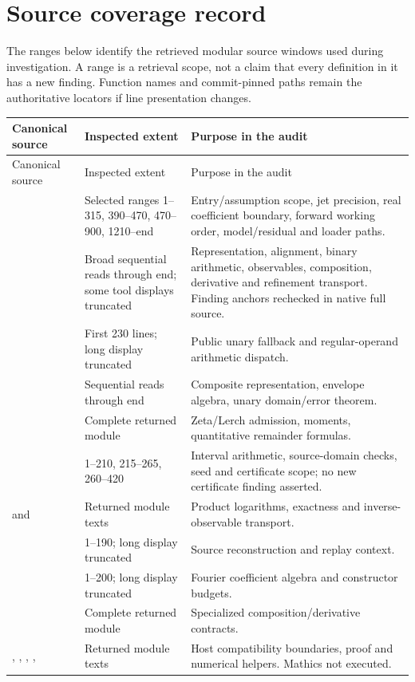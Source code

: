 \documentclass[11pt,a4paper]{article}
\begin{document}
\section{Source coverage record}
\label{app:coverage}
The ranges below identify the retrieved modular source windows used during investigation. A range is a retrieval scope, not a claim that every definition in it has a new finding. Function names and commit-pinned paths remain the authoritative locators if line presentation changes.
\small
\begin{longtable}{@{}P{57mm}P{33mm}P{59mm}@{}}
\toprule
Canonical source & Inspected extent & Purpose in the audit\\
\midrule
\endfirsthead
\toprule Canonical source & Inspected extent & Purpose in the audit\\\midrule
\endhead
{} & Selected ranges 1--315, 390--470, 470--900, 1210--end & Entry/assumption scope, jet precision, real coefficient boundary, forward working order, model/residual and loader paths.\\[4pt]
 & Broad sequential reads through end; some tool displays truncated & Representation, alignment, binary arithmetic, observables, composition, derivative and refinement transport. Finding anchors rechecked in native full source.\\[4pt]
 & First 230 lines; long display truncated & Public unary fallback and regular-operand arithmetic dispatch.\\[4pt]
 & Sequential reads through end & Composite representation, envelope algebra, unary domain/error theorem.\\[4pt]
 & Complete returned module & Zeta/Lerch admission, moments, quantitative remainder formulas.\\[4pt]
 & 1--210, 215--265, 260--420 & Interval arithmetic, source-domain checks, seed and certificate scope; no new certificate finding asserted.\\[4pt]
 and  & Returned module texts & Product logarithms, exactness and inverse-observable transport.\\[4pt]
 & 1--190; long display truncated & Source reconstruction and replay context.\\[4pt]
 & 1--200; long display truncated & Fourier coefficient algebra and constructor budgets.\\[4pt]
 & Complete returned module & Specialized composition/derivative contracts.\\[4pt]
, , , ,  & Returned module texts & Host compatibility boundaries, proof and numerical helpers. Mathics not executed.\\
\bottomrule
\end{longtable}
\end{document}

